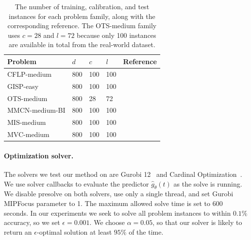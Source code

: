 \documentclass[12pt]{article}
\renewcommand{\cite}[1]{\citep{#1}}
\theoremstyle{definition}
\theoremstyle{remark}
\newcommand{\param}{\theta}
\newcommand{\covars}{X}
\newcommand{\predgap}{\hat{g}}
\newcommand{\tol}{\epsilon}
\newcommand{\ncalib}{c}
\newcommand{\ntrain}{d}
\newcommand{\ntest}{l}
\newcommand{\change}[1]{#1}
\newcommand{\param}{\theta}
\newcommand{\covars}{X}
\newcommand{\predgap}{\hat{g}}
\newcommand{\tol}{\epsilon}
\newcommand{\ncalib}{c}
\newcommand{\ntrain}{d}
\newcommand{\ntest}{l}
\newcommand{\change}[1]{#1}
\theoremstyle{plain}
\theoremstyle{definition}
\theoremstyle{remark}
\begin{document}
\begin{table}
    \centering
    \caption{The number of training, calibration, and test instances for each problem family, along with the corresponding reference. \change{The OTS-medium family uses $\ncalib = 28$ and $\ntest = 72$ because only 100 instances are available in total from the real-world dataset.}}
    \label{tab:problems}
    \small
\begin{tabular}{@{}l l l l l@{}}
\toprule
Problem & $\ntrain$ & $\ncalib$ & $\ntest$ & Reference \\
\midrule
CFLP-medium & 800 & 100 & 100 & \citeauthor{Scavuzzo2022LearningTB} \\
GISP-easy & 800 & 100 & 100 & \citeauthor{hochbaum1997forest} \\
OTS-medium & 800 & 28 & 72 & \citeauthor{Huang2024DistributionalMA} \\
MMCN-medium-BI & 800 & 100 & 100 & \citeauthor{greening2023lead} \\
MIS-medium & 800 & 100 & 100 & \citeauthor{Huang2024DistributionalMA} \\
MVC-medium & 800 & 100 & 100 & \citeauthor{korte2018combinatorial} \\
\bottomrule
\end{tabular}
\end{table}

\paragraph{Optimization solver.}
The solvers we test our method on are \change{Gurobi 12}~\cite{gurobi} and Cardinal Optimization~\cite{Ge2022CardinalO}.
We use solver callbacks to evaluate the predictor $\predgap_\param(t)$ as the solve is running.
We disable presolve on both solvers, use only a single thread, \change{and set Gurobi MIPFocus parameter to 1}. 
The maximum allowed solve time is set to 600 seconds.
In our experiments we seek to solve all problem instances to within $0.1\%$ accuracy, so we set $\epsilon = 0.001$.
We choose $\alpha = 0.05$, so that our solver is likely to return an $\tol$-optimal solution at least $95\%$ of the time.
\end{document}
